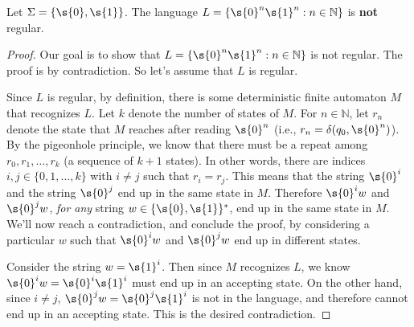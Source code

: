 \begin{flex}
\label{grp:theorem:0n1n-is-not-regular}

\begin{theorem}
\label{theorem:0n1n-is-not-regular}
Let $\Sigma = \{\s{0},\s{1}\}$. The language $L = \{\s{0}^n \s{1}^n: n \in \mathbb{N}\}$ is \textbf{not} regular.

\end{theorem}

\begin{proof}
\label{prf:deterministic-finite-automata::goal}
Our goal is to show that $L = \{\s{0}^n \s{1}^n: n \in \mathbb{N}\}$ is not regular. The proof is by contradiction. So let's assume that $L$ is regular. 

Since $L$ is regular, by definition, there is some deterministic finite automaton $M$ that recognizes $L$. Let $k$ denote the number of states of $M$. For $n \in \mathbb{N}$, let $r_n$ denote the state that $M$ reaches after reading $\s{0}^n$ (i.e., $r_n = \delta(q_0, \s{0}^n)$). By the pigeonhole principle, we know that there must be a repeat among $r_0, r_1,\ldots, r_k$ (a sequence of $k+1$ states). In other words, there are indices $i, j \in \{0,1,\ldots,k\}$ with $i \neq j$ such that $r_i = r_j$. This means that the string $\s{0}^i$ and the string $\s{0}^j$ end up in the same state in $M$. Therefore $\s{0}^iw$ and $\s{0}^jw$, \emph{for any} string $w \in \{\s{0},\s{1}\}^*$, end up in the same state in $M$. We'll now reach a contradiction, and conclude the proof, by considering a particular $w$ such that $\s{0}^iw$ and $\s{0}^jw$ end up in different states. 

Consider the string $w = \s{1}^i$. Then since $M$ recognizes $L$, we know $\s{0}^iw = \s{0}^i\s{1}^i$ must end up in an accepting state. On the other hand, since $i \neq j$, $\s{0}^jw = \s{0}^j\s{1}^i$ is not in the language, and therefore cannot end up in an accepting state. This is the desired contradiction.

\end{proof}
\end{flex}

